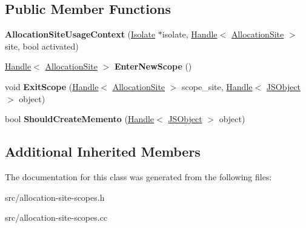\subsection*{Public Member Functions}
\begin{DoxyCompactItemize}
\item 
\hypertarget{classv8_1_1internal_1_1_allocation_site_usage_context_aa9b5b62dbc43c89fbb14b22f32d3f68e}{}{\bfseries Allocation\+Site\+Usage\+Context} (\hyperlink{classv8_1_1internal_1_1_isolate}{Isolate} $\ast$isolate, \hyperlink{classv8_1_1internal_1_1_handle}{Handle}$<$ \hyperlink{classv8_1_1internal_1_1_allocation_site}{Allocation\+Site} $>$ site, bool activated)\label{classv8_1_1internal_1_1_allocation_site_usage_context_aa9b5b62dbc43c89fbb14b22f32d3f68e}

\item 
\hypertarget{classv8_1_1internal_1_1_allocation_site_usage_context_a7155f90f38a179371cbd03d42d3311a4}{}\hyperlink{classv8_1_1internal_1_1_handle}{Handle}$<$ \hyperlink{classv8_1_1internal_1_1_allocation_site}{Allocation\+Site} $>$ {\bfseries Enter\+New\+Scope} ()\label{classv8_1_1internal_1_1_allocation_site_usage_context_a7155f90f38a179371cbd03d42d3311a4}

\item 
\hypertarget{classv8_1_1internal_1_1_allocation_site_usage_context_a27c29c9de5fb9a5afdc56a262b7d095d}{}void {\bfseries Exit\+Scope} (\hyperlink{classv8_1_1internal_1_1_handle}{Handle}$<$ \hyperlink{classv8_1_1internal_1_1_allocation_site}{Allocation\+Site} $>$ scope\+\_\+site, \hyperlink{classv8_1_1internal_1_1_handle}{Handle}$<$ \hyperlink{classv8_1_1internal_1_1_j_s_object}{J\+S\+Object} $>$ object)\label{classv8_1_1internal_1_1_allocation_site_usage_context_a27c29c9de5fb9a5afdc56a262b7d095d}

\item 
\hypertarget{classv8_1_1internal_1_1_allocation_site_usage_context_a9b8b4f20046612a1dc28823efe000043}{}bool {\bfseries Should\+Create\+Memento} (\hyperlink{classv8_1_1internal_1_1_handle}{Handle}$<$ \hyperlink{classv8_1_1internal_1_1_j_s_object}{J\+S\+Object} $>$ object)\label{classv8_1_1internal_1_1_allocation_site_usage_context_a9b8b4f20046612a1dc28823efe000043}

\end{DoxyCompactItemize}
\subsection*{Additional Inherited Members}


The documentation for this class was generated from the following files\+:\begin{DoxyCompactItemize}
\item 
src/allocation-\/site-\/scopes.\+h\item 
src/allocation-\/site-\/scopes.\+cc\end{DoxyCompactItemize}
